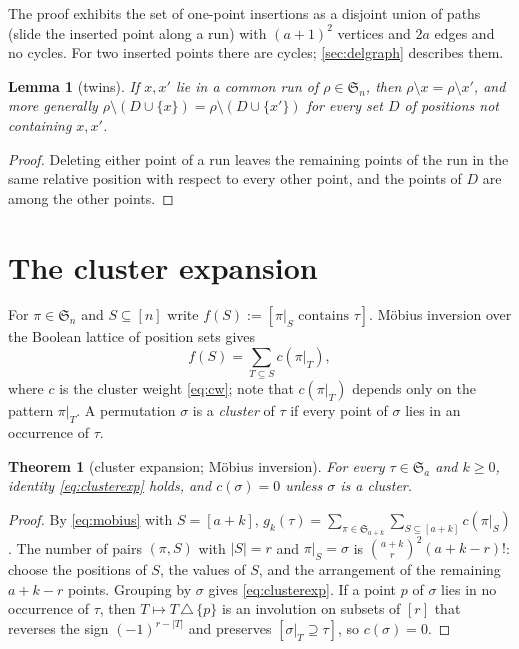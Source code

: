 \documentclass[11pt,reqno]{amsart}
\theoremstyle{plain}
\newtheorem{theorem}{Theorem}[section]
\newtheorem{lemma}[lemma]{Lemma}
\theoremstyle{definition}
\theoremstyle{remark}
\newcommand{\bb}[1]{\left[#1\right]}
\newcommand{\Sym}{\mathfrak{S}}
\begin{document}
The proof exhibits the set of one-point insertions as a disjoint union of paths (slide the inserted point along a run) with $(a+1)^2$ vertices and $2a$ edges and no cycles. For two inserted points there are cycles; \cref{sec:delgraph} describes them.

\begin{lemma}[twins]\label{lem:twins}
If $x,x'$ lie in a common run of $\rho\in\Sym_n$, then $\rho\setminus x=\rho\setminus x'$, and more generally $\rho\setminus(D\cup\{x\})=\rho\setminus(D\cup\{x'\})$ for every set $D$ of positions not containing $x,x'$.
\end{lemma}

\begin{proof}
Deleting either point of a run leaves the remaining points of the run in the same relative position with respect to every other point, and the points of $D$ are among the other points.
\end{proof}

\section{The cluster expansion}\label{sec:cluster}

For $\pi\in\Sym_n$ and $S\subseteq[n]$ write $f(S):=\bb{\pi|_S\text{ contains }\tau}$. Möbius inversion over the Boolean lattice of position sets gives
\begin{equation}\label{eq:mobius}
f(S)=\sum_{T\subseteq S}c(\pi|_T),
\end{equation}
where $c$ is the cluster weight \eqref{eq:cw}; note that $c(\pi|_T)$ depends only on the pattern $\pi|_T$. A permutation $\sigma$ is a \emph{cluster} of $\tau$ if every point of $\sigma$ lies in an occurrence of $\tau$.

\begin{theorem}[cluster expansion; Möbius inversion]\label{thm:cluster}
For every $\tau\in\Sym_a$ and $k\ge0$, identity \eqref{eq:clusterexp} holds, and $c(\sigma)=0$ unless $\sigma$ is a cluster.
\end{theorem}

\begin{proof}
By \eqref{eq:mobius} with $S=[a+k]$, $g_k(\tau)=\sum_{\pi\in\Sym_{a+k}}\sum_{S\subseteq[a+k]}c(\pi|_S)$. The number of pairs $(\pi,S)$ with $|S|=r$ and $\pi|_S=\sigma$ is $\binom{a+k}{r}^2(a+k-r)!$: choose the positions of $S$, the values of $S$, and the arrangement of the remaining $a+k-r$ points. Grouping by $\sigma$ gives \eqref{eq:clusterexp}. If a point $p$ of $\sigma$ lies in no occurrence of $\tau$, then $T\mapsto T\,\triangle\,\{p\}$ is an involution on subsets of $[r]$ that reverses the sign $(-1)^{r-|T|}$ and preserves $\bb{\sigma|_T\supseteq\tau}$, so $c(\sigma)=0$.
\end{proof}
\end{document}
